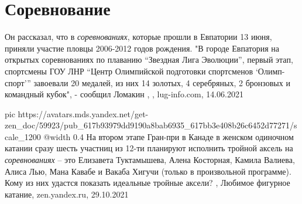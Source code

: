  
 
 
 
 
\chapter{Соревнование}
\label{sec:slova.sorevnovanie}

Он рассказал, что в \emph{соревнованиях}, которые прошли в Евпатории 13 июня,
приняли участие пловцы 2006-2012 годов рождения.  "В городе Евпатория на
открытых соревнованиях по плаванию \enquote{Звездная Лига Эволюции}, первый
этап, спортсмены ГОУ ЛНР \enquote{Центр Олимпийской подготовки
спортсменов \enquote{Олимп-спорт}} завоевали 20 медалей, из них 14 золотых, 4
серебряных, 2 бронзовых и командный кубок", - сообщил Ломакин
, 
, lug-info.com, 14.06.2021

\ifcmt
  pic https://avatars.mds.yandex.net/get-zen_doc/59923/pub_617b93979dd9190a8bab6935_617bb3e408b26c6452d77271/scale_1200
  @width 0.4
\fi
На втором этапе Гран-при в Канаде в женском одиночном катании сразу шесть
участниц из 12-ти планируют исполнить тройной аксель на \emph{соревнованиях} – это
Елизавета Туктамышева, Алена Косторная, Камила Валиева, Алиса Лью, Мана Кавабе
и Вакаба Хигучи (только в произвольной программе).  Кому из них удастся
показать идеальные тройные аксели?
, 
Любимое фигурное катание, zen.yandex.ru, 29.10.2021

